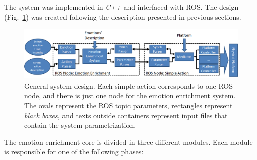 
The system was implemented in \textit{C++} and interfaced with ROS. The design (Fig.~\ref{fig:system_architecture}) was created following the description presented in previous sections. 
\begin{figure}
	\centering
	\includegraphics[width=1.0\textwidth]{Images/SystemArchitecture.png} 	
	\caption{General system design. Each simple action corresponds to one ROS node, and there is just one node for the emotion enrichment system. The ovals represent the ROS topic parameters, rectangles represent \textit{black boxes}, and texts outside containers represent input files that contain the system parametrization.}
	\label{fig:system_architecture}
\end{figure}
The emotion enrichment core is divided in three different modules. 
Each module is responsible for one of the following phases:
